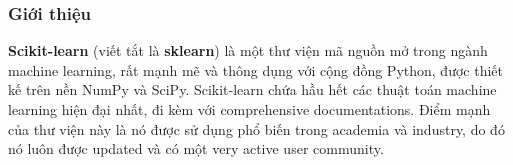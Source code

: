 \subsubsection{Giới thiệu}
\textbf{Scikit-learn} 
(viết tắt là \textbf{sklearn}) là một thư viện mã nguồn mở trong ngành machine learning, 
rất mạnh mẽ và thông dụng với cộng đồng Python, được thiết kế trên nền NumPy và SciPy. 
Scikit-learn chứa hầu hết các thuật toán machine learning hiện đại nhất, 
đi kèm với comprehensive documentations. Điểm mạnh của thư viện này là nó được sử dụng phổ biến trong academia và industry, 
do đó nó luôn được updated và có một very active user community. \break